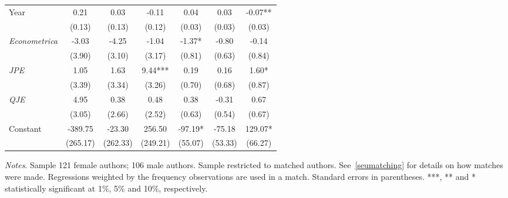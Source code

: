 \begin{table}[H]
\begin{threeparttable}
\begin{tabular}{p{2.5cm}SSSSSS}
            Year                          &        0.21   &        0.03   &       -0.11   &        0.04   &        0.03   &       -0.07** \\
                                          &      (0.13)   &      (0.13)   &      (0.12)   &      (0.03)   &      (0.03)   &      (0.03)   \\
            \textit{Econometrica}         &       -3.03   &       -4.25   &       -1.04   &       -1.37*  &       -0.80   &       -0.14   \\
                                          &      (3.90)   &      (3.10)   &      (3.17)   &      (0.81)   &      (0.63)   &      (0.84)   \\
            \textit{JPE}                  &        1.05   &        1.63   &        9.44***&        0.19   &        0.16   &        1.60*  \\
                                          &      (3.39)   &      (3.34)   &      (3.26)   &      (0.70)   &      (0.68)   &      (0.87)   \\
            \textit{QJE}                  &        4.95   &        0.38   &        0.48   &        0.38   &       -0.31   &        0.67   \\
                                          &      (3.05)   &      (2.66)   &      (2.52)   &      (0.63)   &      (0.54)   &      (0.67)   \\
            Constant                      &     -389.75   &      -23.30   &      256.50   &      -97.19*  &      -75.18   &      129.07*  \\
                                          &    (265.17)   &    (262.33)   &    (249.21)   &     (55.07)   &     (53.33)   &     (66.27)   \\
            \bottomrule
        \end{tabular}
        \begin{tablenotes}
            \tiny
            \item \textit{Notes}. Sample 121 female authors; 106 male authors. Sample restricted to matched authors. See~\autoref{seumatching} for details on how matches were made. Regressions weighted by the frequency observations are used in a match. Standard errors in parentheses. ***, ** and * statistically significant at 1\%, 5\% and 10\%, respectively.
        \end{tablenotes}
    \end{threeparttable}
\end{table}